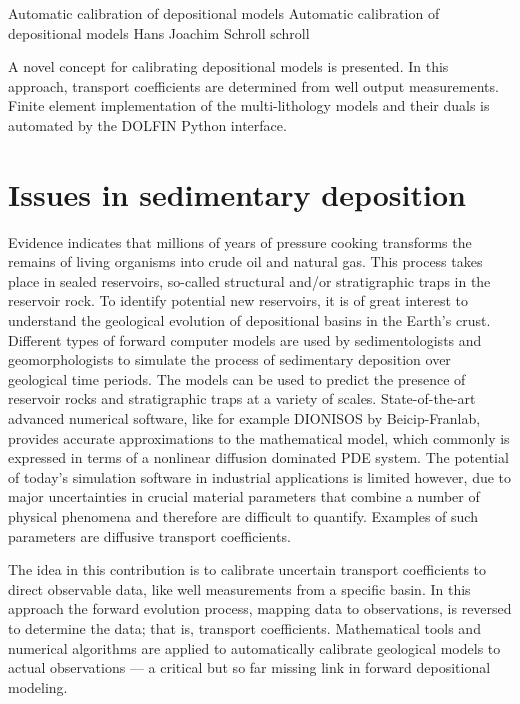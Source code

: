               {Automatic calibration of depositional models}
              {Automatic calibration of depositional models}
              {Hans Joachim Schroll}
              {schroll}

A novel concept for calibrating depositional models is presented. In
this approach, transport coefficients are determined from well output
measurements. Finite element implementation of the multi-lithology
models and their duals is automated by the DOLFIN Python interface.


\section{Issues in sedimentary deposition}

Evidence indicates that millions of years of pressure cooking
transforms the remains of living organisms into crude oil and natural
gas.  This process takes place in sealed reservoirs, so-called
structural and/or stratigraphic traps in the reservoir rock.  To
identify potential new reservoirs, it is of great interest to
understand the geological evolution of depositional basins in the
Earth's crust.  Different types of forward computer models are used by
sedimentologists and geomorphologists to simulate the process of
sedimentary deposition over geological time periods.  The models can
be used to predict the presence of reservoir rocks and stratigraphic
traps at a variety of scales. State-of-the-art advanced numerical
software, like for example DIONISOS by Beicip-Franlab, provides
accurate approximations to the mathematical model, which commonly is
expressed in terms of a nonlinear diffusion dominated PDE system.  The
potential of today's simulation software in industrial applications is
limited however, due to major uncertainties in crucial material
parameters that combine a number of physical phenomena and therefore
are difficult to quantify.  Examples of such parameters are diffusive
transport coefficients.

The idea in this contribution is to calibrate uncertain transport
coefficients to direct observable data, like well measurements from a
specific basin.  In this approach the forward evolution process,
mapping data to observations, is reversed to determine the data; that
is, transport coefficients.  Mathematical tools and numerical
algorithms are applied to automatically calibrate geological models to
actual observations --- a critical but so far missing link in forward
depositional modeling.

